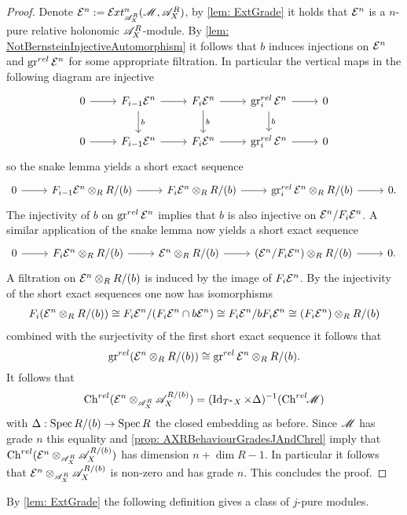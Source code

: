 \begin{proof}
  Denote $\E^n := \Ex{\A_X^R}{n}(\M,\A_X^R)$, by \cref{lem: ExtGrade} it holds that $\mathcal{E}^n$ is a $n$-pure relative holonomic $\mathscr{A}_X^R$-module.
  By \cref{lem: NotBernsteinInjectiveAutomorphism} it follows that $b$ induces injections on $\mathcal{E}^{n}$ and $\operatorname{gr}^{rel} \mathcal{E}^{n}$ for some appropriate filtration.
  In particular the vertical maps in the following diagram are injective
  $$\begin{tikzcd}
    0 \arrow{r} & F_{i-1} \E^n\arrow{r} \arrow{d}{b}& F_i \E^{n}\arrow{r} \arrow{d}{b}& \gr^{rel}_i \E^n\arrow{r}\arrow{d}{b} & 0\\
    0 \arrow{r} & F_{i-1} \E^n\arrow{r} & F_i \E^{n}\arrow{r} & \gr^{rel}_i \E^n\arrow{r} & 0
  \end{tikzcd} $$
  so the snake lemma yields a short exact sequence
  $$\begin{tikzcd}
    0 \arrow{r} & F_{i-1} \E^n\otimes_R R/(b)\arrow{r} & F_i \E^{n}\otimes_R R/(b)\arrow{r} & \gr^{rel}_i \E^n\arrow{r}\otimes_R R/(b) & 0.
  \end{tikzcd} $$
  The injectivity of $b$ on $\operatorname{gr}^{rel}\mathcal{E}^n$ implies that $b$ is also injective on $\mathcal{E}^n/F_i\mathcal{E}^n$. A similar application of the snake lemma now yields a short exact sequence
  $$\begin{tikzcd}
    0 \arrow{r} & F_{i} \E^n\otimes_R R/(b)\arrow{r} & \E^{n}\otimes_R R/(b)\arrow{r} & (\E^n/F_i \E^n )\arrow{r}\otimes_R R/(b) & 0.
  \end{tikzcd} $$
  A filtration on $\mathcal{E}^n \otimes_R R/(b)$ is induced by the image of $F_i\mathcal{E}^n$. By the injectivity of the short exact sequences one now has isomorphisms
  \begin{align*}
    F_i(\mathcal{E}^n \otimes_R R/(b)) \cong F_i\mathcal{E}^n / (F_i \mathcal{E}^n \cap b\mathcal{E}^n) \cong F_i \mathcal{E}^n / b F_i \mathcal{E}^n \cong  (F_i\mathcal{E}^n) \otimes_R R/(b)
  \end{align*}
  combined with the surjectivity of the first short exact sequence it follows that
  $$\operatorname{gr}^{rel}(\mathcal{E}^n \otimes_R R/(b)) \cong \operatorname{gr}^{rel}\mathcal{E}^n \otimes_R R/(b). $$
  It follows that
  $$\operatorname{Ch}^{rel}(\mathcal{E}^n \otimes_{\mathscr{A}_X^R} \mathscr{A}_X^{R/(b)})  = (\operatorname{Id}_{T^*X} \times \Delta)^{-1}(\operatorname{Ch}^{rel}\mkern-5mu \mathscr{M})$$
  with $\Delta: \operatorname{Spec} R/(b) \to \operatorname{Spec} R$ the closed embedding as before.
  Since $\mathscr{M}$ has grade $n$ this equality and \cref{prop: AXRBehaviourGradesJAndChrel} imply that $\operatorname{Ch}^{rel}(\mathcal{E}^n \otimes_{\mathscr{A}_X^R} \mathscr{A}_X^{R/(b)})$ has dimension $n + \dim R - 1$.
  In particular it follows that $\mathcal{E}^n \otimes_{\mathscr{A}_X^R} \mathscr{A}_X^{R/(b)}$ is non-zero and has grade $n$. This concludes the proof.
\end{proof}
By \cref{lem: ExtGrade} the following definition gives a class of $j$-pure modules.
